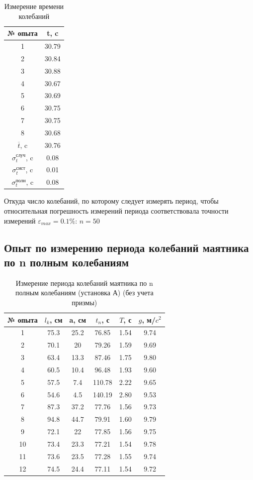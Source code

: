 \documentclass[a4paper,12pt]{article} %
\begin{document}
\begin{table}
\caption{Измерение времени колебаний}
\begin{tabular}{|c|c|}
\hline 
№ опыта & t, c \\ 
\hline 
1 & 30.79 \\ 
\hline 
2 & 30.84 \\ 
\hline 
3 & 30.88 \\ 
\hline 
4 & 30.67 \\ 
\hline 
5 & 30.69 \\ 
\hline 
6 & 30.75 \\ 
\hline 
7 & 30.75 \\ 
\hline 
8 & 30.68 \\ 
\hline 
\hline
$\overline{t}$, c& 30.76 \\ 
\hline
$\sigma_t^\text{случ}$, c& 0.08 \\ 
\hline
$\sigma_t^\text{сист}$, c & 0.01 \\ 
\hline
$\sigma_t^\text{полн}$, c & 0.08 \\ 
\hline
\end{tabular} 
\end{table}
Откуда число колебаний, по которому следует измерять период, чтобы относительная погрешность измерений периода соответствовала точности измерений $\varepsilon_{max} = 0.1 \%$:  $n = 50$
\subsection{Опыт по измерению периода колебаний маятника по n полным колебаниям}
\begin{table}
\caption{Измерение периода колебаний маятника по n полным колебаниям (установка А) (без учета призмы)}
\begin{tabular}{|c|c|c|c|c|c|}
\hline 
№ опыта & $l_k$, см & a, см & $t_n$, с & $T$, с & $g$, м/$c^2$ \\ 
\hline 
1 & 75.3 & 25.2 & 76.85 & 1.54 & 9.74\\ 
\hline 
2 & 70.1 & 20 & 79.26 & 1.59 & 9.69\\ 
\hline 
3 & 63.4 & 13.3 & 87.46 & 1.75 & 9.80\\ 
\hline 
4 & 60.5 & 10.4 & 96.48 & 1.93 & 9.60\\ 
\hline 
5 & 57.5 & 7.4 & 110.78 & 2.22 & 9.65\\ 
\hline 
6 & 54.6 & 4.5 & 140.19 & 2.80 & 9.53\\ 
\hline 
7 & 87.3 & 37.2 & 77.76 & 1.56 & 9.73\\ 
\hline 
8 & 94.8 & 44.7 & 79.91 & 1.60 & 9.79\\ 
\hline 
9 & 72.1 & 22 & 77.85 & 1.56 & 9.75\\ 
\hline 
10 & 73.4 & 23.3 & 77.21 & 1.54 & 9.78\\ 
\hline 
11 & 73.6 & 23.5 & 77.28 & 1.55 & 9.74\\ 
\hline 
12 & 74.5 & 24.4 & 77.11 & 1.54 & 9.72\\ 
\hline 
\end{tabular} 
\end{table}
\end{document}
